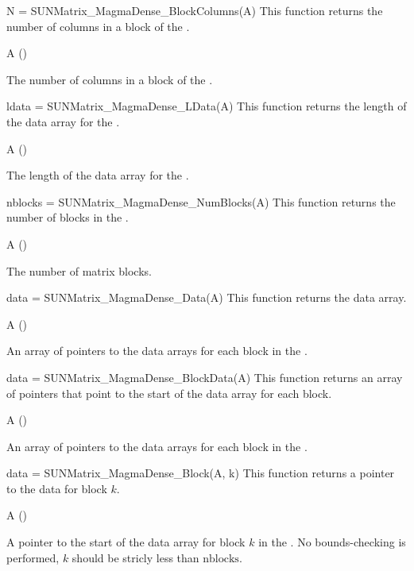{
  N = SUNMatrix\_MagmaDense\_BlockColumns(A)
}
{
  This function returns the number of columns in a block of the .
}
{
  \begin{args}
  \item[A] ()
  \end{args}
}
{
  The number of columns in a block of the .
}
{}

{
  ldata = SUNMatrix\_MagmaDense\_LData(A)
}
{
  This function returns the length of the data array for the .
}
{
  \begin{args}
  \item[A] ()
  \end{args}
}
{
  The length of the data array for the .
}
{}

{
  nblocks = SUNMatrix\_MagmaDense\_NumBlocks(A)
}
{
  This function returns the number of blocks in the .
}
{
  \begin{args}
  \item[A] ()
  \end{args}
}
{
  The number of matrix blocks.
}
{}

{
  data = SUNMatrix\_MagmaDense\_Data(A)
}
{
  This function returns the  data array.
}
{
  \begin{args}
  \item[A] ()
  \end{args}
}
{
  An array of pointers to the data arrays for each block in the .
}
{}

{
  data = SUNMatrix\_MagmaDense\_BlockData(A)
}
{
  This function returns an array of pointers that point to
  the start of the data array for each block.
}
{
  \begin{args}
  \item[A] ()
  \end{args}
}
{
  An array of pointers to the data arrays for each block in the .
}
{}

{
  data = SUNMatrix\_MagmaDense\_Block(A, k)
}
{
  This function returns a pointer to the data for block $k$.
}
{
  \begin{args}
  \item[A] ()
  \end{args}
}
{
  A pointer to the start of the data array for block $k$ in the .
}
{
  No bounds-checking is performed, $k$ should be stricly less than
  $\text{nblocks}$.
}


